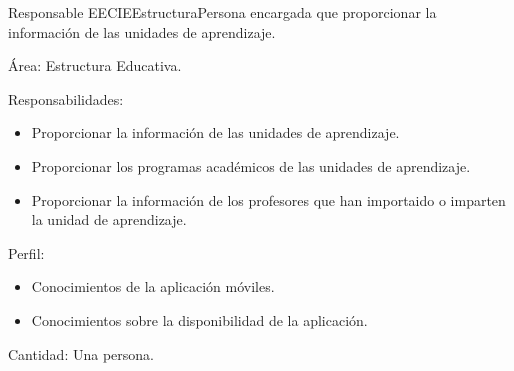 \begin{actor}{Responsable EE}{CIEEstructura}{Persona encargada que proporcionar la información de las unidades de aprendizaje.}
	
	\item[Área:] Estructura Educativa.
	\item[Responsabilidades:] \hspace{1pt}
	
	\begin{itemize}
		
		\item Proporcionar la información de las unidades de aprendizaje.
		\item Proporcionar los programas académicos de las unidades de aprendizaje.
		\item Proporcionar la información de los profesores que han importaido o imparten la unidad de aprendizaje.
	\end{itemize}
	
	\item[Perfil:] \hspace{1pt}
	
	\begin{itemize}
		
		\item Conocimientos de la aplicación móviles.
		\item Conocimientos sobre la disponibilidad de la aplicación.
		
	\end{itemize}
	
	\item[Cantidad:] Una persona.
	
\end{actor}

